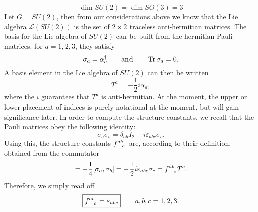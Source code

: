 \begin{example}[]
  \begin{equation}
    \dim SU(2) = \dim SO(3) = 3
  \end{equation}
  Let $G = SU(2)$, then from our considerations above we know that the Lie algebra $\mathscr{L}(SU(2))$ is the set of $2\times 2$ traceless anti-hermitian matrices.
  The basis for the Lie algebra of $SU(2)$ can be built from the hermitian Pauli matrices: for $a = 1, 2, 3$, they satisfy
  \begin{equation}
    \sigma_a = \alpha_a^{\dagger} \qquad \text{and} \qquad \Tr \sigma_a = 0.
  \end{equation}
  A basis element in the Lie algebra of $SU(2)$ can then be written
  \begin{equation}
    T^a = -\frac{1}{2} i \alpha_a,
  \end{equation}
  where the $i$ guarantees that $T^a$ is anti-hermitian.
  At the moment, the upper or lower placement of indices is purely notational at the moment, but will gain significance later.
  In order to compute the structure constants, we recall that the Pauli matrices obey the following identity:
  \begin{equation}
    \sigma_a \sigma_b = \delta_{ab} I_2 + i \varepsilon_{abc} \sigma_c.
  \end{equation}
  Using this, the structure constants $f \indices{^{ab}_c}$ are, according to their definition, obtained from the commutator
  \begin{equation}
    [T^a, T^b] = -\frac{1}{4} [\sigma_a, \sigma_b] = -\frac{1}{2} i \varepsilon_{abc} \sigma_c = f \indices{^{ab}_c} T^c .
  \end{equation}
  Therefore, we simply read off
  \begin{equation}
    \boxed{f \indices{^{ab}_c} = \varepsilon_{abc}} \qquad a,b,c = 1,2,3.
  \end{equation}
\end{example}

